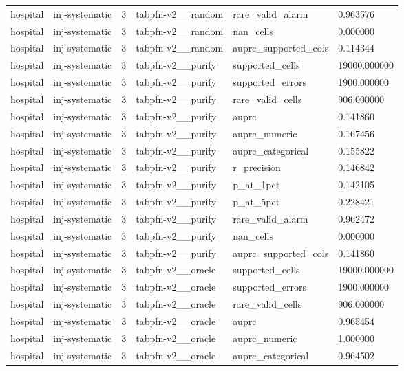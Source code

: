 \begin{tabular}{llllll}
hospital & inj-systematic & 3 & tabpfn-v2\_\_random & rare\_valid\_alarm & 0.963576 \\
hospital & inj-systematic & 3 & tabpfn-v2\_\_random & nan\_cells & 0.000000 \\
hospital & inj-systematic & 3 & tabpfn-v2\_\_random & auprc\_supported\_cols & 0.114344 \\
hospital & inj-systematic & 3 & tabpfn-v2\_\_purify & supported\_cells & 19000.000000 \\
hospital & inj-systematic & 3 & tabpfn-v2\_\_purify & supported\_errors & 1900.000000 \\
hospital & inj-systematic & 3 & tabpfn-v2\_\_purify & rare\_valid\_cells & 906.000000 \\
hospital & inj-systematic & 3 & tabpfn-v2\_\_purify & auprc & 0.141860 \\
hospital & inj-systematic & 3 & tabpfn-v2\_\_purify & auprc\_numeric & 0.167456 \\
hospital & inj-systematic & 3 & tabpfn-v2\_\_purify & auprc\_categorical & 0.155822 \\
hospital & inj-systematic & 3 & tabpfn-v2\_\_purify & r\_precision & 0.146842 \\
hospital & inj-systematic & 3 & tabpfn-v2\_\_purify & p\_at\_1pct & 0.142105 \\
hospital & inj-systematic & 3 & tabpfn-v2\_\_purify & p\_at\_5pct & 0.228421 \\
hospital & inj-systematic & 3 & tabpfn-v2\_\_purify & rare\_valid\_alarm & 0.962472 \\
hospital & inj-systematic & 3 & tabpfn-v2\_\_purify & nan\_cells & 0.000000 \\
hospital & inj-systematic & 3 & tabpfn-v2\_\_purify & auprc\_supported\_cols & 0.141860 \\
hospital & inj-systematic & 3 & tabpfn-v2\_\_oracle & supported\_cells & 19000.000000 \\
hospital & inj-systematic & 3 & tabpfn-v2\_\_oracle & supported\_errors & 1900.000000 \\
hospital & inj-systematic & 3 & tabpfn-v2\_\_oracle & rare\_valid\_cells & 906.000000 \\
hospital & inj-systematic & 3 & tabpfn-v2\_\_oracle & auprc & 0.965454 \\
hospital & inj-systematic & 3 & tabpfn-v2\_\_oracle & auprc\_numeric & 1.000000 \\
hospital & inj-systematic & 3 & tabpfn-v2\_\_oracle & auprc\_categorical & 0.964502 \\

\end{tabular}
